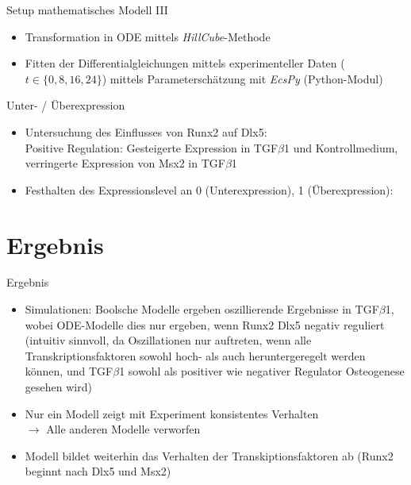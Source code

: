 \documentclass[handout]{beamer}
\begin{document}
\begin{frame}{Setup mathematisches Modell III}
\begin{itemize}
	\item Transformation in ODE mittels \emph{HillCube}-Methode
	\pause
	\item Fitten der Differentialgleichungen mittels experimenteller Daten ($t \in \{0,8,16,24\}$) mittels Parametersch\"atzung mit \emph{EcsPy} (Python-Modul)
\end{itemize}
\end{frame}

\begin{frame}{Unter- / \"Uberexpression}
\begin{itemize}
	\item Untersuchung des Einflusses von Runx2 auf Dlx5:
	\pause
	\\ Positive Regulation: Gesteigerte Expression in TGF$\beta$1 und Kontrollmedium, verringerte Expression von Msx2 in TGF$\beta$1 
	\item Festhalten des Expressionslevel an 0 (Unterexpression), 1 (\"Uberexpression): 
\end{itemize}
\end{frame}


\section{Ergebnis}

\begin{frame}{Ergebnis}
\begin{itemize}
	\item Simulationen: Boolsche Modelle ergeben oszillierende Ergebnisse in TGF$\beta$1, wobei ODE-Modelle dies nur ergeben, wenn Runx2 Dlx5 negativ reguliert
	\pause (intuitiv sinnvoll, da Oszillationen nur auftreten, wenn alle Transkriptionsfaktoren sowohl hoch- als auch heruntergeregelt werden k\"onnen, und TGF$\beta$1 sowohl als positiver wie negativer Regulator Osteogenese gesehen wird)
	\pause
	\item Nur ein Modell zeigt mit Experiment konsistentes Verhalten
	\\ $\rightarrow$ Alle anderen Modelle verworfen
	\pause
	\item Modell bildet weiterhin das Verhalten der Transkiptionsfaktoren ab (Runx2 beginnt nach Dlx5 und Msx2)
\end{itemize}
\end{frame}
\end{document}
